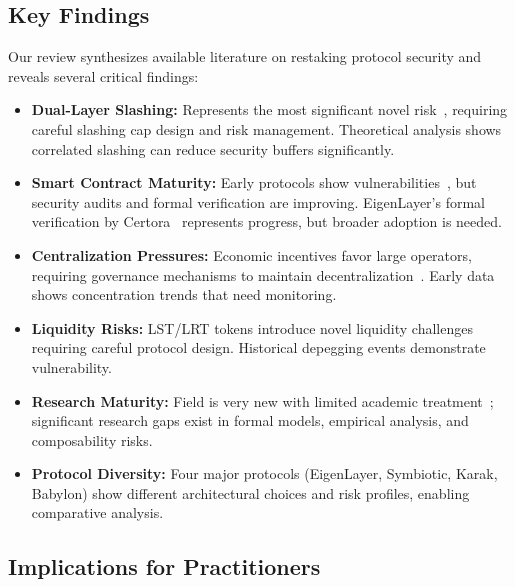 \documentclass[runningheads]{llncs}
\begin{document}
\subsection{Key Findings}

Our review synthesizes available literature on restaking protocol security and reveals several critical findings:

\begin{itemize}
    \item \textbf{Dual-Layer Slashing:} Represents the most significant novel risk~\cite{durvasula2024robust}, requiring careful slashing cap design and risk management. Theoretical analysis shows correlated slashing can reduce security buffers significantly.
    
    \item \textbf{Smart Contract Maturity:} Early protocols show vulnerabilities~\cite{certora2025,code4rena2023}, but security audits and formal verification are improving. EigenLayer's formal verification by Certora~\cite{certora2025} represents progress, but broader adoption is needed.
    
    \item \textbf{Centralization Pressures:} Economic incentives favor large operators, requiring governance mechanisms to maintain decentralization~\cite{chen2022rollup}. Early data shows concentration trends that need monitoring.
    
    \item \textbf{Liquidity Risks:} LST/LRT tokens introduce novel liquidity challenges~\cite{trailofbits2023staking} requiring careful protocol design. Historical depegging events demonstrate vulnerability.
    
    \item \textbf{Research Maturity:} Field is very new with limited academic treatment~\cite{durvasula2024robust,zhang2024proof,li2024mitigating}; significant research gaps exist in formal models, empirical analysis, and composability risks.
    
    \item \textbf{Protocol Diversity:} Four major protocols (EigenLayer, Symbiotic, Karak, Babylon) show different architectural choices and risk profiles, enabling comparative analysis.
\end{itemize}

\subsection{Implications for Practitioners}
\end{document}
